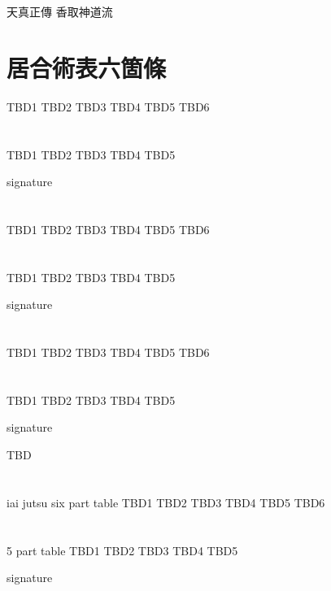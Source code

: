 \documentclass[dvipdfmx, a4paper, 12pt]{utarticle}
\begin{document}
\begin{CJK*}{UTF8}{min}
\CJKtilde
\begin{landscape}

\newpage
\pagestyle{empty}
天真正傳
香取神道流
\section{居合術表六箇條}
TBD1
TBD2
TBD3
TBD4
TBD5
TBD6
\section{}
TBD1
TBD2
TBD3
TBD4
TBD5

signature

\newpage
\pagestyle{empty}
\section{}
TBD1
TBD2
TBD3
TBD4
TBD5
TBD6
\section{}
TBD1
TBD2
TBD3
TBD4
TBD5

signature

\newpage
\pagestyle{empty}
\section{}
TBD1
TBD2
TBD3
TBD4
TBD5
TBD6
\section{}
TBD1
TBD2
TBD3
TBD4
TBD5

signature

\newpage
\pagestyle{empty}
TBD
\section{}
iai jutsu six part table
TBD1
TBD2
TBD3
TBD4
TBD5
TBD6
\section{}
5 part table
TBD1
TBD2
TBD3
TBD4
TBD5

signature

\end{landscape}
\end{CJK*}
\end{document}
